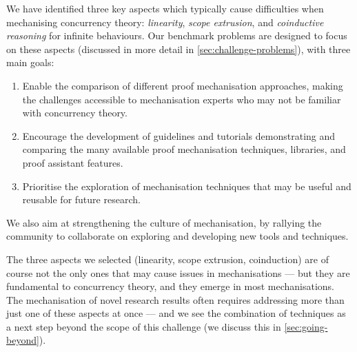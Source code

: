 \documentclass[runningheads]{llncs}
\begin{document}
We have identified three key aspects which typically cause difficulties when
mechanising concurrency theory: \emph{linearity}, \emph{scope extrusion},
and \emph{coinductive reasoning} for infinite behaviours.
Our benchmark problems are designed to focus on these aspects (discussed
in more detail in \cref{sec:challenge-problems}), with three main goals:

\begin{enumerate}[label=\textbf{(G\arabic*)},leftmargin=10mm]
\item\label{item:goal-comperison-accessibility} Enable the comparison of
  different proof mechanisation approaches, making the challenges accessible to
  mechanisation experts who may not be familiar with concurrency theory.

\item\label{item:goal-tutorials} Encourage the development of guidelines and
  tutorials demonstrating and comparing the many available proof mechanisation
  techniques, libraries, and proof assistant features.

\item\label{item:goal-reusability} Prioritise the exploration of mechanisation
  techniques that may be useful and reusable for future research.
\end{enumerate}

We also aim at strengthening the culture of mechanisation, by rallying the
community to collaborate on exploring and developing new tools and techniques.

The three aspects we selected (linearity, scope extrusion, coinduction) are of
course not the only ones that may cause issues in mechanisations --- but they
are fundamental to concurrency theory, and they emerge in most mechanisations.
The mechanisation of novel research results often requires addressing more than
just one of these aspects at once --- and we see the combination of techniques
as a next step beyond the scope of this challenge (we discuss this in
\cref{sec:going-beyond}).

\end{document}
